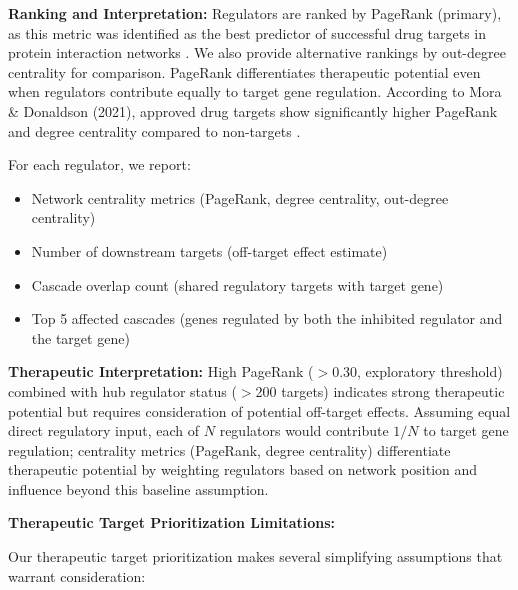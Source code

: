 \documentclass[11pt]{article}
\begin{document}
\textbf{Ranking and Interpretation:}
Regulators are ranked by PageRank (primary), as this metric was identified as the best predictor of successful drug targets in protein interaction networks \cite{mora2021}. We also provide alternative rankings by out-degree centrality for comparison. PageRank differentiates therapeutic potential even when regulators contribute equally to target gene regulation. According to Mora \& Donaldson (2021), approved drug targets show significantly higher PageRank and degree centrality compared to non-targets \cite{mora2021}.

For each regulator, we report:
\begin{itemize}
\item Network centrality metrics (PageRank, degree centrality, out-degree centrality)
\item Number of downstream targets (off-target effect estimate)
\item Cascade overlap count (shared regulatory targets with target gene)
\item Top 5 affected cascades (genes regulated by both the inhibited regulator and the target gene)
\end{itemize}

\textbf{Therapeutic Interpretation:}
High PageRank ($>$0.30, exploratory threshold) combined with hub regulator status ($>$200 targets) indicates strong therapeutic potential but requires consideration of potential off-target effects. Assuming equal direct regulatory input, each of $N$ regulators would contribute $1/N$ to target gene regulation; centrality metrics (PageRank, degree centrality) differentiate therapeutic potential by weighting regulators based on network position and influence beyond this baseline assumption.

\textbf{Therapeutic Target Prioritization Limitations:}

Our therapeutic target prioritization makes several simplifying assumptions that warrant consideration:
\end{document}

